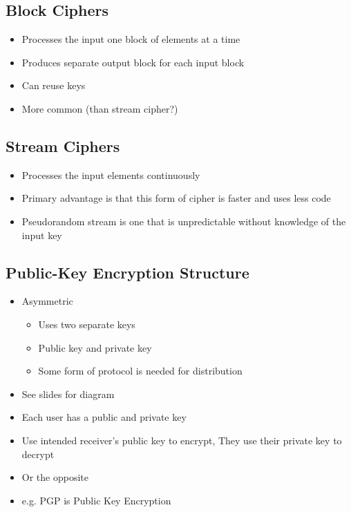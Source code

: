 \documentclass[11pt]{article}
\begin{document}
\subsection{Block Ciphers}
\label{sec:org312c147}
\begin{itemize}
\item Processes the input one block of elements at a time
\item Produces separate output block for each input block
\item Can reuse keys
\item More common (than stream cipher?)
\end{itemize}
\subsection{Stream Ciphers}
\label{sec:orgb6951af}
\begin{itemize}
\item Processes the input elements continuously
\item Primary advantage is that this form of cipher is faster and uses less code
\item Pseudorandom stream is one that is unpredictable without knowledge of the input key
\end{itemize}
\subsection{Public-Key Encryption Structure}
\label{sec:orgb034db7}
\begin{itemize}
\item Asymmetric
\begin{itemize}
\item Uses two separate keys
\item Public key and private key
\item Some form of protocol is needed for distribution
\end{itemize}
\item See slides for diagram
\item Each user has a public and private key
\item Use intended receiver's public key to encrypt, They use their private key to decrypt
\item Or the opposite
\item e.g. PGP is Public Key Encryption
\end{itemize}
\end{document}
